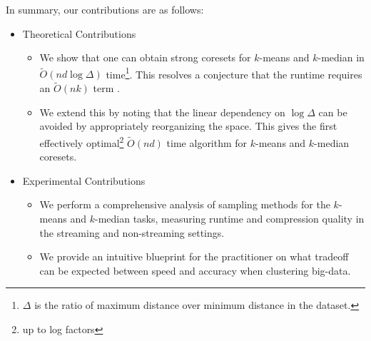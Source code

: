 In summary, our contributions are as follows:
\begin{itemize}
    \item Theoretical Contributions
    \begin{itemize}
        \item We show that one can obtain strong coresets for $k$-means and $k$-median in $\tilde{O}(nd \log \Delta)$ time\footnote{$\Delta$ is the ratio of
            maximum distance over minimum distance in the dataset.}. This resolves a conjecture that the runtime requires an $\tilde{O}(nk)$ term \cite{DSWY22}.
        \item We extend this by noting that the linear dependency on $\log \Delta$ can be avoided by appropriately reorganizing the space. This gives the first
            effectively optimal\footnote{up to log factors} $\tilde{O}(nd)$ time algorithm for $k$-means and $k$-median coresets.
    \end{itemize}
    \item Experimental Contributions
    \begin{itemize}
        \item We perform a comprehensive analysis of sampling methods for the $k$-means and $k$-median tasks, measuring runtime and compression quality in the
            streaming and non-streaming settings.
        \item We provide an intuitive blueprint for the practitioner on what tradeoff can be expected between speed and accuracy when clustering big-data.
    \end{itemize}
\end{itemize}
